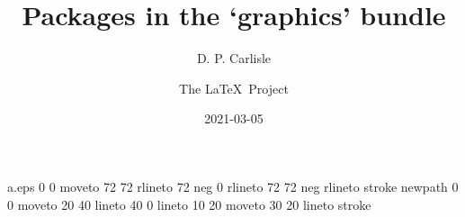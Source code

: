 
\begin{filecontents*}{a.eps}
0 0 moveto
72 72 rlineto
72 neg 0 rlineto
72 72 neg rlineto
stroke
newpath
0 0 moveto
20 40 lineto
40 0 lineto
10 20 moveto
30 20 lineto
stroke
\end{filecontents*}
\documentclass{ltxguide}

\usepackage{color,graphicx,shortvrb}



\renewcommand\star{{\ttfamily*}}

\let\package\textsf

\newlength{\gxlen}
\settowidth{\gxlen}{\package{graphicx}: }
\newcommand\gs{\makebox[\gxlen][l]{\package{graphics}:}}
\newcommand\gx{\makebox[\gxlen][l]{\package{graphicx}:}}

\MakeShortVerb{\|}


\title{Packages in the `graphics' bundle}
\author{D. P. Carlisle \and The \LaTeX\ Project}
\date{2021-03-05}

\maketitle

\tableofcontents

\section{Introduction}
This document serves as a user-manual for the packages \package{color},
\package{graphics}, and \package{graphicx}. Further documentation may be
obtained by processing the  source (|dtx|) files of the individual
packages.

